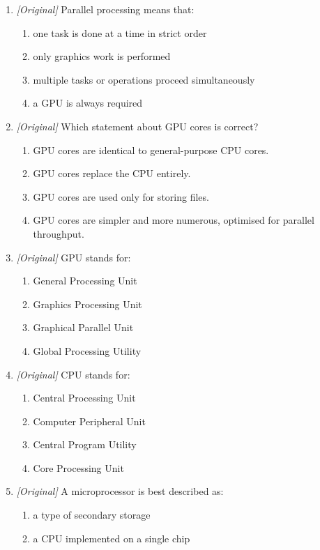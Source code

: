 \begin{enumerate}[label=\textbf{Q\arabic*.}, leftmargin=*]
\item \textit{[Original]} Parallel processing means that:
  \begin{enumerate}[label=\Alph*.]
    \item one task is done at a time in strict order
    \item only graphics work is performed
    \item multiple tasks or operations proceed simultaneously
    \item a GPU is always required
  \end{enumerate}
\item \textit{[Original]} Which statement about GPU cores is correct?
  \begin{enumerate}[label=\Alph*.]
    \item GPU cores are identical to general-purpose CPU cores.
    \item GPU cores replace the CPU entirely.
    \item GPU cores are used only for storing files.
    \item GPU cores are simpler and more numerous, optimised for parallel
      throughput.
  \end{enumerate}
\item \textit{[Original]} GPU stands for:
  \begin{enumerate}[label=\Alph*.]
    \item General Processing Unit
    \item Graphics Processing Unit
    \item Graphical Parallel Unit
    \item Global Processing Utility
  \end{enumerate}
\item \textit{[Original]} CPU stands for:
  \begin{enumerate}[label=\Alph*.]
    \item Central Processing Unit
    \item Computer Peripheral Unit
    \item Central Program Utility
    \item Core Processing Unit
  \end{enumerate}
\item \textit{[Original]} A microprocessor is best described as:
  \begin{enumerate}[label=\Alph*.]
    \item a type of secondary storage
    \item a CPU implemented on a single chip

\end{enumerate}
\end{enumerate}
